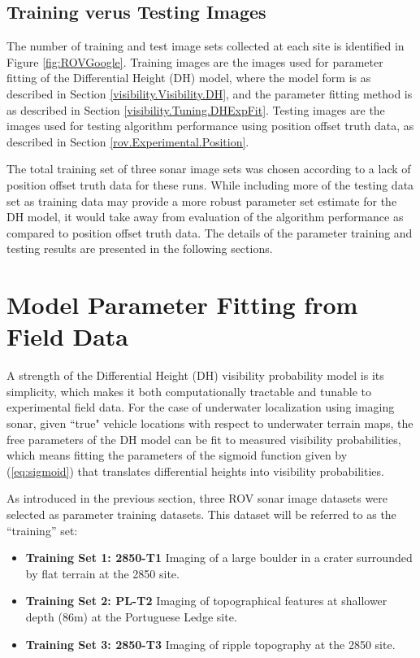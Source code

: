\subsection{Training verus Testing Images}
\label{rov.Field.Training}

The number of training and test image sets collected at each site is identified in Figure \ref{fig:ROVGoogle}.
Training images are the images used for parameter fitting of the Differential Height (DH) model, where the model form is as described in Section \ref{visibility.Visibility.DH}, and the parameter fitting method is as described in Section \ref{visibility.Tuning.DHExpFit}.
Testing images are the images used for testing algorithm performance using position offset truth data, as described in Section \ref{rov.Experimental.Position}.

The total training set of three sonar image sets was chosen according to a lack of position offset truth data for these runs.
While including more of the testing data set as training data may provide a more robust parameter set estimate for the DH model, it would take away from evaluation of the algorithm performance as compared to position offset truth data.
The details of the parameter training and testing results are presented in the following sections.

\section{Model Parameter Fitting from Field Data}
\label{rov.dhFit}

A strength of the Differential Height (DH) visibility probability model is its simplicity, which makes it both computationally tractable and tunable to experimental field data.
For the case of underwater localization using imaging sonar, given ``true" vehicle locations with respect to underwater terrain maps, the free parameters of the DH model can be fit to measured visibility probabilities, which means fitting the parameters of the sigmoid function given by (\ref{eq:sigmoid}) that translates differential heights into visibility probabilities.

As introduced in the previous section, three ROV sonar image datasets were selected as parameter training datasets.  This dataset will be referred to as the ``training'' set:

\begin{itemize}
\item \textbf{Training Set 1: 2850-T1 } Imaging of a large boulder in a crater surrounded by flat terrain at the 2850 site. 
\item \textbf{Training Set 2: PL-T2} Imaging of topographical features at shallower depth (86m) at the Portuguese Ledge site.
\item \textbf{Training Set 3: 2850-T3} Imaging of ripple topography at the 2850 site.
\end{itemize}

